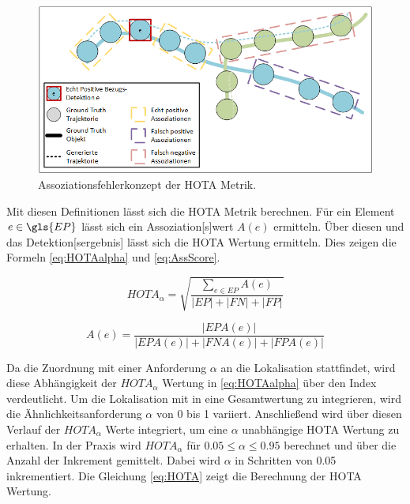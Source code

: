 \begin{figure}[htp]
    \centering
    \includegraphics[width=\textwidth]{img/Grafiken/HOTA Assoziationsfehlerkonzept.png}
    \caption{Assoziationsfehlerkonzept der HOTA Metrik. \cite{HOTA}}
    \label{fig:KonzeptAssHOTA}
\end{figure}

Mit diesen Definitionen lässt sich die \gls{HOTA} Metrik berechnen. Für ein Element \(e \in \gls{EP}\) lässt sich ein \gls{Assoziation}[s]wert \(A(e)\) ermitteln. Über diesen und das \gls{Detektion}[sergebnis] lässt sich die \gls{HOTA} Wertung ermitteln. Dies zeigen die Formeln \ref{eq:HOTAalpha} und \ref{eq:AssScore}.

\begin{equation}
    \label{eq:HOTAalpha}
    HOTA_{\alpha} = \sqrt{\frac{\sum_{e \in EP} A(e)}{|EP| + |FN| + |FP|}}
\end{equation}

\begin{equation}
    \label{eq:AssScore}
    A(e) = \frac{|EPA(e)|}{|EPA(e)| + |FNA(e)| + |FPA(e)|}
\end{equation}

Da die Zuordnung mit einer Anforderung \(\alpha\) an die \gls{Lokalisation} stattfindet, wird diese Abhängigkeit der \(HOTA_{\alpha}\) Wertung in \ref{eq:HOTAalpha} über den Index verdeutlicht. Um die \gls{Lokalisation} mit in eine Gesamtwertung zu integrieren, wird die Ähnlichkeitsanforderung \(\alpha\) von 0 bis 1 variiert. Anschließend wird über diesen Verlauf der \(HOTA_{\alpha}\) Werte integriert, um eine \(\alpha\) unabhängige \gls{HOTA} Wertung zu erhalten. In der Praxis wird \(HOTA_{\alpha}\) für \(0.05 \leq \alpha \leq 0.95\) berechnet und über die Anzahl der Inkrement gemittelt. Dabei wird \(\alpha\) in Schritten von 0.05 inkrementiert. Die Gleichung \ref{eq:HOTA} zeigt die Berechnung der \gls{HOTA} Wertung.

